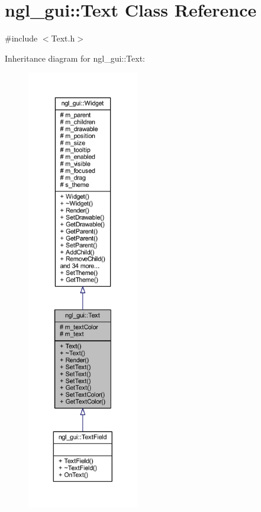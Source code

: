 \hypertarget{classngl__gui_1_1_text}{}\section{ngl\+\_\+gui\+:\+:Text Class Reference}
\label{classngl__gui_1_1_text}


{\ttfamily \#include $<$Text.\+h$>$}



Inheritance diagram for ngl\+\_\+gui\+:\+:Text\+:\nopagebreak
\begin{figure}[H]
\begin{center}
\leavevmode
\includegraphics[height=550pt]{classngl__gui_1_1_text__inherit__graph}
\end{center}
\end{figure}


